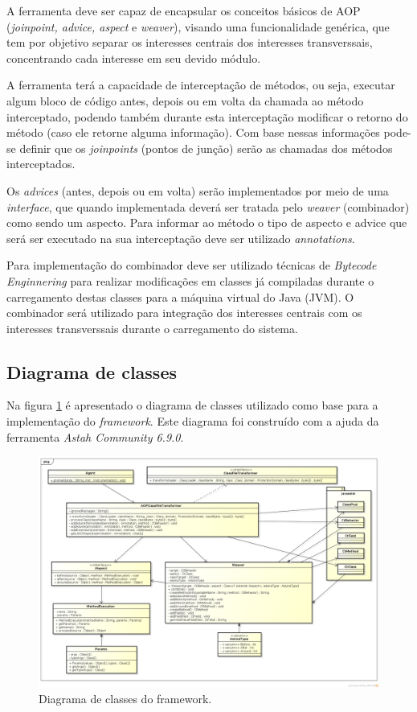 \documentclass[tc,openright]{iiufrgs}
\begin{document}
A ferramenta deve ser capaz de encapsular os conceitos básicos de AOP (\textit{joinpoint, advice, aspect} e \textit{weaver}), visando uma funcionalidade genérica, que tem por objetivo separar os interesses centrais dos interesses transverssais, concentrando cada interesse em seu devido módulo.

A ferramenta terá a capacidade de interceptação de métodos, ou seja, executar algum bloco de código antes, depois ou em volta da chamada ao método interceptado, podendo também durante esta interceptação modificar o retorno do método (caso ele retorne alguma informação). Com base nessas informações pode-se definir que os \textit{joinpoints} (pontos de junção) serão as chamadas dos métodos interceptados.

Os \textit{advices} (antes, depois ou em volta) serão implementados por meio de uma \textit{interface}, que quando implementada deverá ser tratada pelo \textit{weaver} (combinador) como sendo um aspecto. Para informar ao método o tipo de aspecto e advice que será ser executado na sua interceptação deve ser utilizado \textit{annotations}.

Para implementação do combinador deve ser utilizado técnicas de \textit{Bytecode Enginnering} para realizar modificações em classes já compiladas durante o carregamento destas classes para a máquina virtual do Java (JVM). O combinador será utilizado para integração dos interesses centrais com os interesses transverssais durante o carregamento do sistema.

\subsection{Diagrama de classes}

Na figura \ref{fig:diagramaClassesAOP} é apresentado o diagrama de classes utilizado como base para a implementação do \textit{framework}. Este diagrama foi construído com a ajuda da ferramenta \textit{Astah Community 6.9.0}.


\begin{figure}[ht]
	\centering
	\includegraphics[scale=0.4]{diagramas/Framework_AOP.png}
	\caption{Diagrama de classes do framework.}
	\label{fig:diagramaClassesAOP}
\end{figure}
\end{document}
